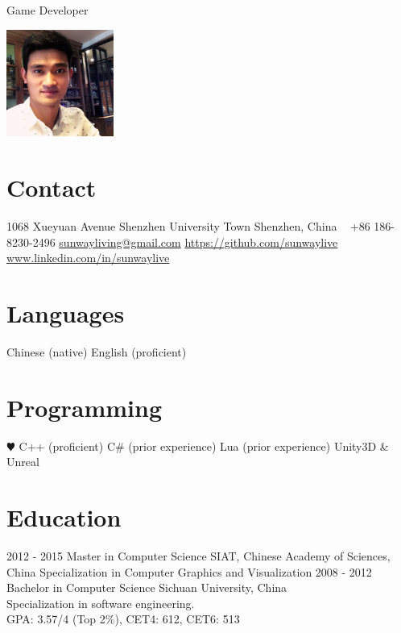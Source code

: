 \documentclass[]{friggeri-cv}
\begin{document}
       {Game Developer}
\begin{aside}
  \includegraphics[width=100pt]{sunwei}
  \section{Contact}
    1068 Xueyuan Avenue
    Shenzhen University Town
    Shenzhen, China
    ~
    +86 186-8230-2496
    \href{mailto:sunwayliving@gmail.com}{sunwayliving@gmail.com}
    \href{https://github.com/sunwaylive}{\small{https://github.com/sunwaylive}}
    \href{http://www.linkedin.com/pub/sun-wei/87/626/128}{\small{www.linkedin.com/in/sunwaylive}}
  \section{Languages}
    Chinese (native)
    English (proficient)
  \section{Programming}
    {\color{red} $\varheartsuit$} C++ (proficient)
    C\# (prior experience)
    Lua (prior experience)
    Unity3D \& Unreal
\end{aside}

\section{Education}
\begin{entrylist}
\entry
{2012 - 2015}
{Master {\normalfont in Computer Science}}
{SIAT, Chinese Academy of Sciences, China}
{Specialization in Computer Graphics and Visualization}
\entry
{2008 - 2012}
{Bachelor {\normalfont in Computer Science}}
{Sichuan University, China}
{\\Specialization in software engineering. 
 \\GPA: 3.57/4 (Top 2\%), CET4: 612, CET6: 513}
\end{entrylist}
\end{document}
